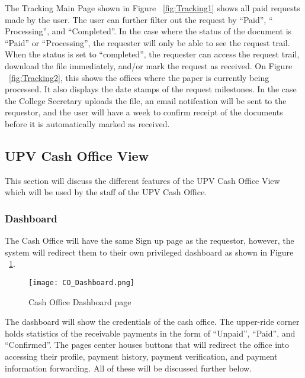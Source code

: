 The Tracking Main Page shown in Figure ~\ref{fig:Tracking1} shows all paid requests made by the user. The user can further filter out the request by “Paid”, “ Processing”, and “Completed”. In the case where the status of the document is “Paid” or “Processing”, the requester will only be able to see the request trail. When the status is set to “completed”, the requester can access the request trail, download the file immediately, and/or mark the request as received. On Figure ~\ref{fig:Tracking2}, this shows the offices where the paper is currently being processed. It also displays the date stamps of the request milestones. In the case the College Secretary uploads the file, an email notifcation will be sent to the requestor, and the user will have a week to confirm receipt of the documents before it is automatically marked as received.

\subsection{UPV Cash Office View}

This section will discuss the different features of the UPV Cash Office View which will be used by the staff of the UPV Cash Office.

\subsubsection{Dashboard}

The Cash Office will have the same Sign up page as the requestor, however, the system will redirect them to their own privileged dashboard as shown in Figure ~\ref{fig:CO_Dashboard}.
    \begin{figure}[h]
        \centering 
        \begin{minipage}[c]{0.5\linewidth}
            \centering
            \texttt{[image: CO\_Dashboard.png]}
            \caption{Cash Office Dashboard page}
            \label{fig:CO_Dashboard}
        \end{minipage}
    \end{figure}

The dashboard will show the credentials of the cash office. The upper-ride corner holds statistics of the receivable payments in the form of “Unpaid”, “Paid”, and “Confirmed”. The page\textsc{}s center houses buttons that will redirect the office into accessing their profile, payment history, payment verification, and payment information forwarding. All of these will be discussed further below.

